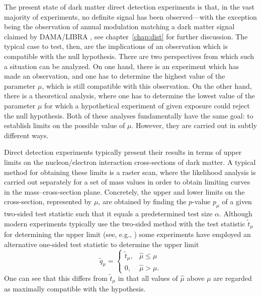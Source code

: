 \documentclass[b5paper, 10pt, twoside]{book}
\begin{document}
The present state of dark matter direct detection experiments is that, in the vast majority of experiments, no definite signal has been observed---with the exception being the observation of annual modulation matching a dark matter signal claimed by DAMA/LIBRA \parencite{BernabeiEtAl2023}, see chapter~\ref{chap:dist} for further discussion. The typical case to test, then, are the implications of an observation which is compatible with the null hypothesis. There are two perspectives from which such a situation can be analyzed. On one hand, there is an experiment which has made an observation, and one has to determine the highest value of the parameter $\mu$, which is still compatible with this observation. On the other hand, there is a theoretical analysis, where one has to determine the lowest value of the parameter $\mu$ for which a hypothetical experiment of given exposure could reject the null hypothesis. Both of these analyses fundamentally have the same goal: to establish limits on the possible value of $\mu$. However, they are carried out in subtly different ways.

Direct detection experiments typically present their results in terms of upper limits on the nucleon/electron interaction cross-sections of dark matter. A typical method for obtaining these limits is a raster scan, where the likelihood analysis is carried out separately for a set of mass values in order to obtain limiting curves in the mass--cross-section plane. Concretely, the upper and lower limits on the cross-section, represented by $\mu$, are obtained by finding the $p$-value $p_\mu$ of a given two-sided test statistic such that it equals a predetermined test size $\alpha$. Although modern experiments typically use the two-sided method with the test statistic $\tilde{t}_\mu$ for determining the upper limit (see, e.g., \textcites{XENON2019b, PandaX2021, LZ2024}) some experiments have employed an alternative one-sided test statistic to determine the upper limit \parencite{CowanEtAl2011}
\begin{equation}
    \tilde{q}_\mu=
    \begin{cases}
        \tilde{t}_\mu,&\hat{\mu}\leq\mu\\
        0,&\hat{\mu}>\mu.
    \end{cases}
\end{equation}
One can see that this differs from $\tilde{t}_\mu$ in that all values of $\hat{\mu}$ above $\mu$ are regarded as maximally compatible with the hypothesis.
\end{document}
